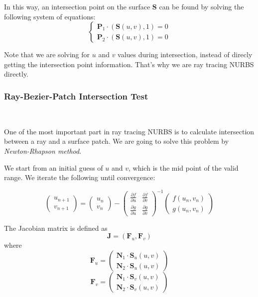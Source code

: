\documentclass[acmtog]{acmart}
\begin{document}
In this way, an intersection point on the surface $\mathbf{S}$ can be found by solving the following system of equations:
\[\begin{cases}
	\mathbf{P}_1 \cdot (\mathbf{S}(u, v), 1) = 0\\
	\mathbf{P}_2 \cdot (\mathbf{S}(u, v), 1) = 0
\end{cases}\]

Note that we are solving for $u$ and $v$ values during intersection, instead of direcly getting the intersection point information. That's why we are ray tracing NURBS directly.

\subsubsection{Ray-Bezier-Patch Intersection Test}

\ 

One of the most important part in ray tracing NURBS is to calculate intersection between a ray and a surface patch. We are going to solve this problem by \textit{Newton-Rhapson method}. 

We start from an initial guess of $u$ and $v$, which is the mid point of the valid range. We iterate the following until convergence: 

\[
	\left(\begin{matrix}
		u_{n+1} \\ v_{n+1}
	\end{matrix}\right)	
	= 
	\left(\begin{matrix}
		u_n \\ v_n
	\end{matrix}\right) - 
	\left(\begin{matrix}
		\frac{\partial f}{\partial u} & \frac{\partial f}{\partial v} \\
		\frac{\partial g}{\partial u} & \frac{\partial g}{\partial v}
	\end{matrix}\right)^{-1}
	\left(\begin{matrix}
		f(u_n, v_n) \\ g(u_n, v_n)
	\end{matrix}\right)
\]

The Jacobian matrix is defined as \[
	\mathbf{J} = (\mathbf{F}_u, \mathbf{F}_v)	
\] where \[
	\mathbf{F}_u = \left(\begin{matrix}
		\mathbf{N}_1 \cdot \mathbf{S}_u(u, v)\\
		\mathbf{N}_2 \cdot \mathbf{S}_u(u, v)
	\end{matrix}\right)	
\]\[
	\mathbf{F}_v = \left(\begin{matrix}
		\mathbf{N}_1 \cdot \mathbf{S}_v(u, v)\\
		\mathbf{N}_2 \cdot \mathbf{S}_v(u, v)
	\end{matrix}\right)	
\]
\end{document}
